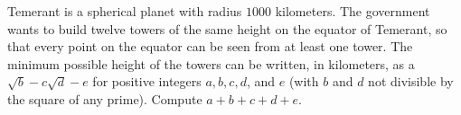 Temerant is a spherical planet with radius $1000$ kilometers. The government wants to build twelve towers of the same height on the equator of Temerant, so that every point on the equator can be seen from at least one tower. The minimum possible height of the towers can be written, in kilometers, as a $\sqrt{b} - c\sqrt{d} - e$ for positive integers $a, b, c, d$, and $e$ (with $b$ and $d$ not divisible by the square of any prime). Compute $a + b + c + d + e$.